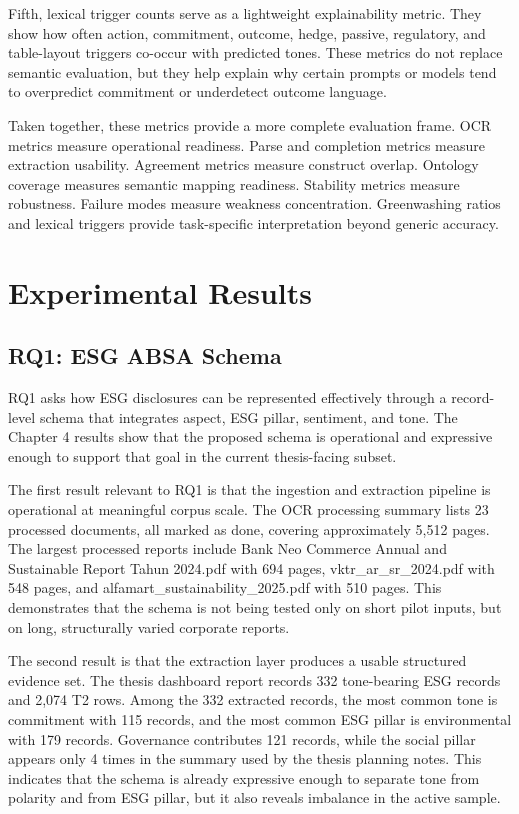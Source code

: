 Fifth, lexical trigger counts serve as a lightweight explainability metric. They show how often action, commitment, outcome, hedge, passive, regulatory, and table-layout triggers co-occur with predicted tones. These metrics do not replace semantic evaluation, but they help explain why certain prompts or models tend to overpredict commitment or underdetect outcome language.

Taken together, these metrics provide a more complete evaluation frame. OCR metrics measure operational readiness. Parse and completion metrics measure extraction usability. Agreement metrics measure construct overlap. Ontology coverage measures semantic mapping readiness. Stability metrics measure robustness. Failure modes measure weakness concentration. Greenwashing ratios and lexical triggers provide task-specific interpretation beyond generic accuracy.

\section{Experimental Results}

\subsection{RQ1: ESG ABSA Schema}

RQ1 asks how ESG disclosures can be represented effectively through a record-level schema that integrates aspect, ESG pillar, sentiment, and tone. The Chapter 4 results show that the proposed schema is operational and expressive enough to support that goal in the current thesis-facing subset.

The first result relevant to RQ1 is that the ingestion and extraction pipeline is operational at meaningful corpus scale. The OCR processing summary lists 23 processed documents, all marked as done, covering approximately 5,512 pages. The largest processed reports include Bank Neo Commerce Annual and Sustainable Report Tahun 2024.pdf with 694 pages, vktr\_ar\_sr\_2024.pdf with 548 pages, and alfamart\_sustainability\_2025.pdf with 510 pages. This demonstrates that the schema is not being tested only on short pilot inputs, but on long, structurally varied corporate reports.

The second result is that the extraction layer produces a usable structured evidence set. The thesis dashboard report records 332 tone-bearing ESG records and 2,074 T2 rows. Among the 332 extracted records, the most common tone is commitment with 115 records, and the most common ESG pillar is environmental with 179 records. Governance contributes 121 records, while the social pillar appears only 4 times in the summary used by the thesis planning notes. This indicates that the schema is already expressive enough to separate tone from polarity and from ESG pillar, but it also reveals imbalance in the active sample.


